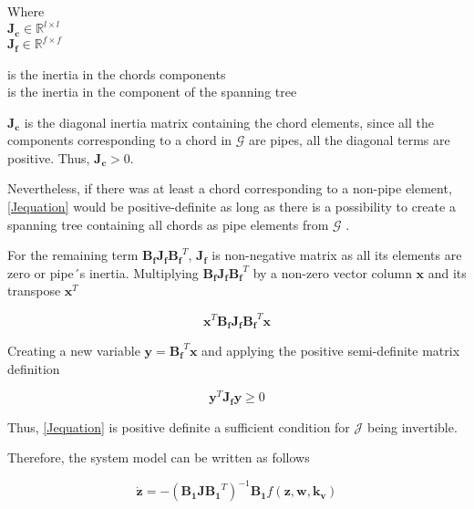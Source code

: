 \begin{minipage}[t]{0.20\textwidth}
Where\\
\hspace*{8mm} $\pmb{J_c} \in \mathbb{R}^{l \times l}$  \\
\hspace*{8mm} $\pmb{J_f} \in \mathbb{R}^{f \times f} $ 
\end{minipage}
\begin{minipage}[t]{0.68\textwidth}
\vspace*{2mm}
\hspace*{4mm} is the inertia in the chords components\\
\hspace*{4mm} is the inertia in the component of the spanning tree 
\end{minipage}

$\pmb{J_c}$ is the diagonal inertia matrix containing the chord elements, since all 
the components corresponding to a chord in $\pmb{\mathcal{G}}$ are pipes, all the 
diagonal terms are positive. Thus, $\pmb{J_c} > 0$. 

Nevertheless, if there was at least a chord corresponding to a non-pipe element, \eqref{Jequation} 
would be positive-definite as long as there is a possibility to create a spanning tree containing all chords as pipe elements from $\pmb{\mathcal{G}}$ \cite{TowerModel}.

For the remaining term $\pmb{B_f J_f {B_f}}^T$, $\pmb{J_f}$ is non-negative matrix as all its elements are zero or pipe´s inertia. 
Multiplying $\pmb{B_f J_f {B_f}}^T$ by a non-zero vector column $\mathbf{x}$ and its transpose $\mathbf{x}^{T}$

\begin{equation}
  \pmb{x}^{T} \pmb{B_f J_f {B_f}}^T \pmb{x}
  \label{PosDefi}
\end{equation}

Creating a new variable $\pmb{y} = \pmb{B_f}^T \mathbf{x}$ and applying the positive semi-definite matrix definition 
\cite{MatrixBook}

\begin{equation}
  \pmb{y}^{T} \pmb{J_f y} \geqslant 0
  \label{PosDefEq}
\end{equation}

Thus, \eqref{Jequation} is positive definite a sufficient condition for $\pmb{\mathcal{J}}$ being invertible. 

Therefore, the system model can be written as follows

\begin{equation}
   \pmb{\dot{z}}  = - (\pmb{B_1 J {B_1}}^T)^{-1}\pmb{B_1} f(\pmb{z},\pmb{ w}, \pmb{k_v})
   \label{ParatModelFinal}
 \end{equation}

